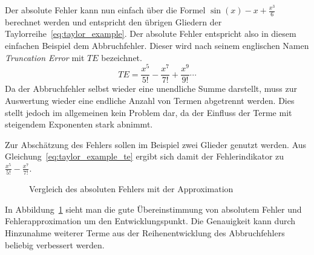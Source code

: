 Der absolute Fehler kann nun einfach über die Formel $\sin(x) - x + \frac{x^3}{6}$
berechnet werden und entspricht den übrigen Gliedern der Taylorreihe~\eqref{eq:taylor_example}.
Der absolute Fehler entspricht also in diesem einfachen Beispiel dem Abbruchfehler.
Dieser wird nach seinem englischen Namen \textit{Truncation Error} mit $TE$ bezeichnet.
\begin{equation}
  TE = \frac{x^5}{5!} -\frac{x^7}{7!} +\frac{x^9}{9!}\cdots
 \label{eq:taylor_example_te}
\end{equation}
Da der Abbruchfehler selbst wieder eine unendliche Summe darstellt, muss zur Auswertung
wieder eine endliche Anzahl von Termen abgetrennt werden. Dies stellt jedoch im allgemeinen
kein Problem dar, da der Einfluss der Terme mit steigendem Exponenten stark abnimmt.

Zur Abschätzung des Fehlers sollen im Beispiel zwei Glieder genutzt werden. Aus
Gleichung~\eqref{eq:taylor_example_te} ergibt sich damit der Fehlerindikator zu
$\frac{x^5}{5!} -\frac{x^7}{7!} $.
\begin{figure}[h]
\centering
\caption{Vergleich des absoluten Fehlers mit der Approximation}
 \label{fig:taylor_example_te}
\end{figure}
In Abbildung~\ref{fig:taylor_example_te} sieht man die gute Übereinstimmung von absolutem Fehler und Fehlerapproximation um den Entwicklungspunkt. Die Genauigkeit kann durch Hinzunahme weiterer Terme aus der Reihenentwicklung des Abbruchfehlers beliebig verbessert werden.

